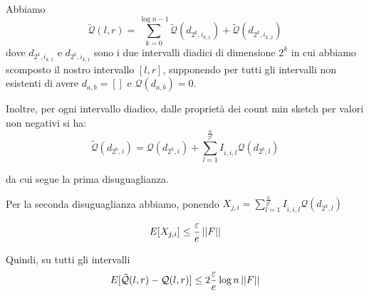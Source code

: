 \begin{proof*}
    Abbiamo
    \[
        \tilde{\mathcal{Q}}(l, r) = \sum_{k = 0}^{\log{n}-1} \tilde{\mathcal{Q}}(d_{2^k, i_{k, 1}}) +
            \tilde{\mathcal{Q}}(d_{2^k, i_{k, 2}})
    \]
    dove $d_{2^k, i_{k, 1}}$ e $d_{2^k, i_{k, 1}}$ sono i due intervalli
    diadici di dimensione $2^k$ in cui abbiamo scomposto il nostro intervallo
    $[l, r]$, supponendo per tutti gli intervalli non esistenti di avere $d_{a,b} = []$
    e $\mathcal{Q}(d_{a, b}) = 0$.

    Inoltre, per ogni intervallo diadico, dalle proprietà dei count min sketch
    per valori non negativi si ha:
    \[
        \tilde{\mathcal{Q}}(d_{2^k, i}) =
            \mathcal{Q}(d_{2^k, i}) + \sum_{l=1}^{\frac{n}{2^k}} I_{\hat{i}, i, l} \mathcal{Q}(d_{2^k, l})
    \]

    da cui segue la prima disuguaglianza.

    Per la seconda disuguaglianza abbiamo, ponendo $X_{j,i} =
    \sum_{l=1}^{\frac{n}{2^k}} I_{\hat{i}, i, l} \mathcal{Q}(d_{2^k, l})$

    \[
        E[X_{j, i}] \le \frac{\varepsilon}{e} \left|\left|F\right|\right|
    \]


    Quindi, su tutti gli intervalli
    \[
        E[\tilde{\mathcal{Q}}(l, r) - \mathcal{Q}(l, r)] \le 2 \frac{\varepsilon}{e} \log{n} \left|\left|F\right|\right|
    \]



\end{proof*}
